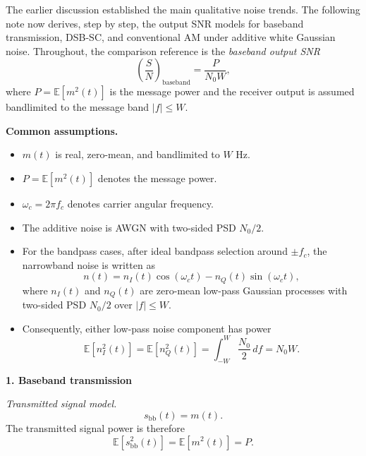 The earlier discussion established the main qualitative noise trends. The
following note now derives, step by step, the output SNR models for baseband
transmission, DSB-SC, and conventional AM under additive white Gaussian noise.
Throughout, the comparison reference is the \emph{baseband output SNR}
\begin{equation}
\left(\frac{S}{N}\right)_{\mathrm{baseband}}
=
\frac{P}{N_0 W},
\end{equation}
where $P=\mathbb{E}[m^2(t)]$ is the message power and the receiver output is
assumed bandlimited to the message band $\lvert f \rvert \leq W$.

\begin{tcolorbox}[breakable, colback=cyan!4!white, colframe=cyan!60!black,
title={\textbf{Intuition: Step-by-Step Output SNR Models Under AWGN}}]
\textbf{Common assumptions.}
\begin{itemize}
\item $m(t)$ is real, zero-mean, and bandlimited to $W$ Hz.
\item $P = \mathbb{E}[m^2(t)]$ denotes the message power.
\item $\omega_c = 2\pi f_c$ denotes carrier angular frequency.
\item The additive noise is AWGN with two-sided PSD $N_0/2$.
\item For the bandpass cases, after ideal bandpass selection around $\pm f_c$,
the narrowband noise is written as
\begin{equation}
n(t)=n_I(t)\cos(\omega_c t)-n_Q(t)\sin(\omega_c t),
\end{equation}
where $n_I(t)$ and $n_Q(t)$ are zero-mean low-pass Gaussian processes with
two-sided PSD $N_0/2$ over $\lvert f \rvert \leq W$.
\item Consequently, either low-pass noise component has power
\begin{equation}
\mathbb{E}[n_I^2(t)] = \mathbb{E}[n_Q^2(t)] = \int_{-W}^{W}\frac{N_0}{2}\,df = N_0 W.
\end{equation}
\end{itemize}

\textbf{1. Baseband transmission}

\emph{Transmitted signal model.}
\begin{equation}
s_{\mathrm{bb}}(t)=m(t).
\end{equation}
The transmitted signal power is therefore
\begin{equation}
\mathbb{E}[s_{\mathrm{bb}}^2(t)] = \mathbb{E}[m^2(t)] = P.
\end{equation}


\end{tcolorbox}
